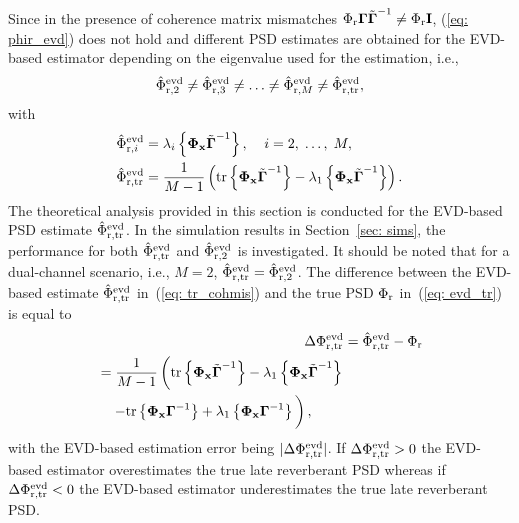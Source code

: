 \documentclass[10pt]{IEEEtran}
\begin{document}
Since in the presence of coherence matrix mismatches $\Phi_{\rm r} \boldsymbol{\Gamma}\tilde{\boldsymbol{\Gamma}}^{-1} \neq \Phi_{\rm r} \mathbf{I}$, (\ref{eq: phir_evd}) does not hold and different PSD estimates are obtained for the EVD-based estimator depending on the eigenvalue used for the estimation, i.e.,
\begin{equation}
\hat{\Phi}^{\rm evd}_{{\rm r},2} \neq \hat{\Phi}^{\rm evd}_{{\rm r},3} \neq \ldots \neq \hat{\Phi}^{\rm evd}_{{\rm r},M} \neq \hat{\Phi}^{\rm evd}_{\rm r, tr},
\end{equation}
with 
\begin{align}
\label{eq: 2_cohmis}
\hat{\Phi}^{\rm evd}_{{\rm r},i} & = \lambda_i\left\{\mathbf{\Phi}_{\mathbf{x}}\tilde{\boldsymbol{\Gamma}}^{-1}\right\}, \; \; \; \; i = 2, \; \ldots, \; M, \\
\label{eq: tr_cohmis}
\hat{\Phi}^{\rm evd}_{\rm r, tr} & = \frac{1}{M-1} \left( {\rm tr} \left\{ \mathbf{\Phi}_{\mathbf{x}}\tilde{\boldsymbol{\Gamma}}^{-1} \right\} - \lambda_1\left\{\mathbf{\Phi}_{\mathbf{x}}\tilde{\boldsymbol{\Gamma}}^{-1}\right\}\right).
\end{align}
The theoretical analysis provided in this section is conducted for the EVD-based PSD estimate $\hat{\Phi}^{\rm evd}_{\rm r, tr}$.
In the simulation results in Section~\ref{sec: sims}, the performance for both $\hat{\Phi}^{\rm evd}_{{\rm r,tr}}$ and $\hat{\Phi}^{\rm evd}_{{\rm r,2}}$ is investigated.
It should be noted that for a dual-channel scenario, i.e., $M = 2$, $\hat{\Phi}^{\rm evd}_{{\rm r,tr}} = \hat{\Phi}^{\rm evd}_{{\rm r,2}}$.
The difference between the EVD-based estimate $\hat{\Phi}^{\rm evd}_{\rm r, tr}$ in~(\ref{eq: tr_cohmis}) and the true PSD $\Phi_{\rm r}$ in~(\ref{eq: evd_tr}) is equal to
\begin{align}
\Delta \Phi^{\rm evd}_{\rm r,tr} & = \hat{\Phi}^{\rm evd}_{\rm r,tr} - \Phi_{\rm r} \\
\label{eq: evd_finalcoh}
\begin{split}
&= \frac{1}{M-1} \left( \vphantom{\frac12} {\rm tr} \left\{ \boldsymbol{\Phi}_{\mathbf{x}}\tilde{\boldsymbol{\Gamma}}^{-1} \right\} - \lambda_1\left\{ \mathbf{\Phi}_{\mathbf{x}}\tilde{\boldsymbol{\Gamma}}^{-1}\right\} \right. \\
  &\quad \left. - {\rm tr} \left\{ \boldsymbol{\Phi}_{\mathbf{x}}\boldsymbol{\Gamma}^{-1} \right\} +\lambda_1\left\{ \mathbf{\Phi}_{\mathbf{x}}\boldsymbol{\Gamma}^{-1}\right\}  \vphantom{\frac12}\right),
\end{split}
\end{align}
with the EVD-based estimation error being $|\Delta \Phi^{\rm evd}_{\rm r,tr}|$.
If $\Delta \Phi^{\rm evd}_{\rm r,tr} > 0$ the EVD-based estimator overestimates the true late reverberant PSD whereas if $\Delta \Phi^{\rm evd}_{\rm r,tr} < 0$ the EVD-based estimator underestimates the true late reverberant PSD.
\end{document}

